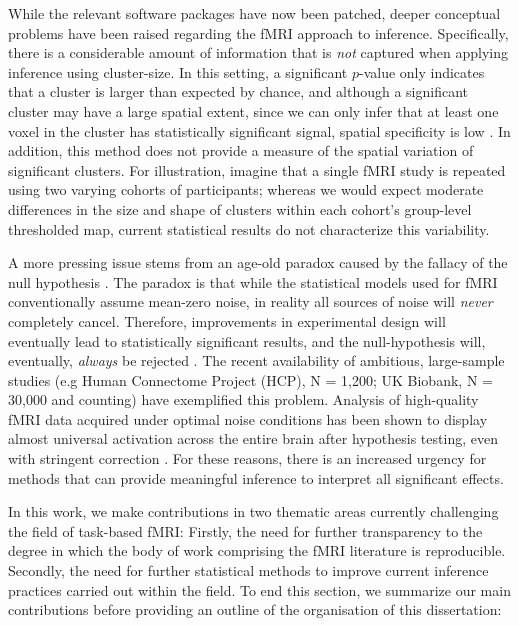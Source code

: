 While the relevant software packages have now been patched, deeper conceptual problems have been raised regarding the fMRI approach to inference. Specifically, there is a considerable amount of information that is \textit{not} captured when applying inference using cluster-size. In this setting, a significant $p$-value only indicates that a cluster is larger than expected by chance, and although a significant cluster may have a large spatial extent, since we can only infer that at least one voxel in the cluster has statistically significant signal, spatial specificity is low \citep{Woo2014-ji}. In addition, this method does not provide a measure of the spatial variation of significant clusters. For illustration, imagine that a single fMRI study is repeated using two varying cohorts of participants; whereas we would expect moderate differences in the size and shape of clusters within each cohort's group-level thresholded map, current statistical results do not characterize this variability. 

A more pressing issue stems from an age-old paradox caused by the fallacy of the null hypothesis \citep{Rozeboom1960-dp}. The paradox is that while the statistical models used for fMRI conventionally assume mean-zero noise, in reality all sources of noise will \textit{never} completely cancel. Therefore, improvements in experimental design will eventually lead to statistically significant results, and the null-hypothesis will, eventually, \textit{always} be rejected \citep{Meehl1967-ij}. The recent availability of ambitious, large-sample studies (e.g Human Connectome Project (HCP), N = 1,200; UK Biobank, N = 30,000 and counting) have exemplified this problem. Analysis of high-quality fMRI data acquired under optimal noise conditions has been shown to display almost universal activation across the entire brain after hypothesis testing, even with stringent correction \citep{Gonzalez-Castillo2012-do}. For these reasons, there is an increased urgency for methods that can provide meaningful inference to interpret all significant effects. 

\bigskip

\noindent In this work, we make contributions in two thematic areas currently challenging the field of task-based fMRI: Firstly, the need for further transparency to the degree in which the body of work comprising the fMRI literature is reproducible. Secondly, the need for further statistical methods to improve current inference practices carried out within the field. To end this section, we summarize our main contributions before providing an outline of the organisation of this dissertation: 

